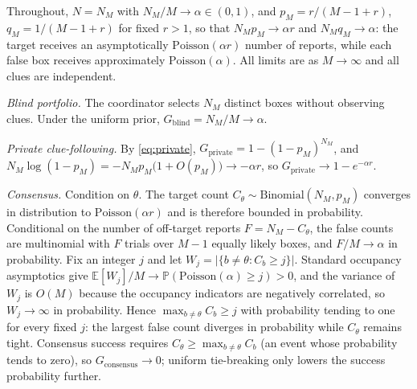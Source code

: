 \documentclass[11pt]{article}
\theoremstyle{definition}
\theoremstyle{remark}
\newcommand{\E}{\mathbb{E}}
\newcommand{\Prob}{\mathbb{P}}
\newcommand{\1}{\mathbf{1}}
\newcommand{\priv}{\mathrm{private}}
\newcommand{\cons}{\mathrm{consensus}}
\begin{document}
Throughout, $N=N_M$ with $N_M/M\to\alpha\in(0,1)$, and $p_M=r/(M-1+r)$, $q_M=1/(M-1+r)$ for fixed $r>1$, so that $N_Mp_M\to\alpha r$ and $N_Mq_M\to\alpha$: the target receives an asymptotically $\mathrm{Poisson}(\alpha r)$ number of reports, while each false box receives approximately $\mathrm{Poisson}(\alpha)$. All limits are as $M\to\infty$ and all clues are independent.

\emph{Blind portfolio.} The coordinator selects $N_M$ distinct boxes without observing clues. Under the uniform prior, $G_{\mathrm{blind}}=N_M/M\to\alpha$.

\emph{Private clue-following.} By \cref{eq:private}, $G_{\priv}=1-(1-p_M)^{N_M}$, and $N_M\log(1-p_M)=-N_Mp_M\bigl(1+O(p_M)\bigr)\to-\alpha r$, so $G_{\priv}\to1-e^{-\alpha r}$.

\emph{Consensus.} Condition on $\theta$. The target count $C_\theta\sim\mathrm{Binomial}(N_M,p_M)$ converges in distribution to $\mathrm{Poisson}(\alpha r)$ and is therefore bounded in probability. Conditional on the number of off-target reports $F=N_M-C_\theta$, the false counts are multinomial with $F$ trials over $M-1$ equally likely boxes, and $F/M\to\alpha$ in probability. Fix an integer $j$ and let $W_j=|\{b\neq\theta:C_b\ge j\}|$. Standard occupancy asymptotics give $\E[W_j]/M\to\Prob(\mathrm{Poisson}(\alpha)\ge j)>0$, and the variance of $W_j$ is $O(M)$ because the occupancy indicators are negatively correlated, so $W_j\to\infty$ in probability. Hence $\max_{b\neq\theta}C_b\ge j$ with probability tending to one for every fixed $j$: the largest false count diverges in probability while $C_\theta$ remains tight. Consensus success requires $C_\theta\ge\max_{b\neq\theta}C_b$ (an event whose probability tends to zero), so $G_{\cons}\to0$; uniform tie-breaking only lowers the success probability further.
\end{document}
